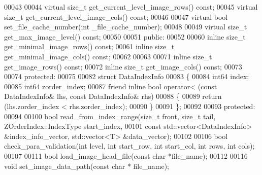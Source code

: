 \begin{DoxyCode}
00043 
00044         \textcolor{keyword}{virtual} \textcolor{keywordtype}{size\_t} get_current_level_image_rows() \textcolor{keyword}{const}; 
00045         \textcolor{keyword}{virtual} \textcolor{keywordtype}{size\_t} get_current_level_image_cols() \textcolor{keyword}{const};
00046 
00047         \textcolor{keyword}{virtual} \textcolor{keywordtype}{bool} set_file_cache_number(\textcolor{keywordtype}{int} \_file\_cache\_number);
00048 
00049         \textcolor{keyword}{virtual} \textcolor{keywordtype}{size\_t} get_max_image_level() \textcolor{keyword}{const};
00050 
00051 \textcolor{keyword}{public}:
00052 
00060         \textcolor{keyword}{inline} \textcolor{keywordtype}{size\_t} get_minimal_image_rows() \textcolor{keyword}{const}; 
00061         \textcolor{keyword}{inline} \textcolor{keywordtype}{size\_t} get\_minimal\_image\_cols() \textcolor{keyword}{const};
00062 
00063 
00071         \textcolor{keyword}{inline} \textcolor{keywordtype}{size\_t} get_image_rows() \textcolor{keyword}{const};
00072         \textcolor{keyword}{inline} \textcolor{keywordtype}{size\_t} get\_image\_cols() \textcolor{keyword}{const};
00073 
00074 \textcolor{keyword}{protected}:
00075 
00082         \textcolor{keyword}{struct }DataIndexInfo
00083         \{
00084                 int64 index;                    
00085                 int64 zorder_index;     
00087                 \textcolor{keyword}{friend} \textcolor{keyword}{inline} \textcolor{keywordtype}{bool} operator< (\textcolor{keyword}{const} DataIndexInfo& lhs, \textcolor{keyword}{const} 
      DataIndexInfo& rhs) 
00088                 \{
00089                         \textcolor{keywordflow}{return} (lhs.zorder_index < rhs.zorder_index);
00090                 \}
00091         \};
00092 
00093 \textcolor{keyword}{protected}:
00094 
00100         \textcolor{keywordtype}{bool} read_from_index_range(\textcolor{keywordtype}{size\_t} front, \textcolor{keywordtype}{size\_t} tail, 
      ZOrderIndex::IndexType start\_index, 
00101                 \textcolor{keyword}{const} std::vector<DataIndexInfo> &index\_info\_vector, 
      std::vector<T> &data\_vector);
00102 
00106         \textcolor{keywordtype}{bool} check_para_validation(\textcolor{keywordtype}{int} level, \textcolor{keywordtype}{int} start\_row, \textcolor{keywordtype}{int} start\_col, \textcolor{keywordtype}{int}
       rows, \textcolor{keywordtype}{int} cols);
00107 
00111         \textcolor{keywordtype}{bool} load_image_head_file(\textcolor{keyword}{const} \textcolor{keywordtype}{char} *file\_name);
00112 
00116         \textcolor{keywordtype}{void} set_image_data_path(\textcolor{keyword}{const} \textcolor{keywordtype}{char} * file\_name);

\end{DoxyCode}
